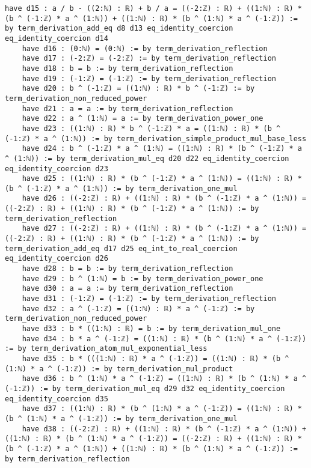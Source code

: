 \documentclass{article}
\begin{document}
\begin{tcolorbox}[colback=white!10, width=\linewidth]
\begin{lstlisting}[language=Lean4]
    have d15 : a / b - ((2:ℕ) : ℝ) + b / a = ((-2:ℤ) : ℝ) + ((1:ℕ) : ℝ) * (b ^ (-1:ℤ) * a ^ (1:ℕ)) + ((1:ℕ) : ℝ) * (b ^ (1:ℕ) * a ^ (-1:ℤ)) := by term_derivation_add_eq d8 d13 eq_identity_coercion eq_identity_coercion d14
    have d16 : (0:ℕ) = (0:ℕ) := by term_derivation_reflection
    have d17 : (-2:ℤ) = (-2:ℤ) := by term_derivation_reflection
    have d18 : b = b := by term_derivation_reflection
    have d19 : (-1:ℤ) = (-1:ℤ) := by term_derivation_reflection
    have d20 : b ^ (-1:ℤ) = ((1:ℕ) : ℝ) * b ^ (-1:ℤ) := by term_derivation_non_reduced_power
    have d21 : a = a := by term_derivation_reflection
    have d22 : a ^ (1:ℕ) = a := by term_derivation_power_one
    have d23 : ((1:ℕ) : ℝ) * b ^ (-1:ℤ) * a = ((1:ℕ) : ℝ) * (b ^ (-1:ℤ) * a ^ (1:ℕ)) := by term_derivation_simple_product_mul_base_less
    have d24 : b ^ (-1:ℤ) * a ^ (1:ℕ) = ((1:ℕ) : ℝ) * (b ^ (-1:ℤ) * a ^ (1:ℕ)) := by term_derivation_mul_eq d20 d22 eq_identity_coercion eq_identity_coercion d23
    have d25 : ((1:ℕ) : ℝ) * (b ^ (-1:ℤ) * a ^ (1:ℕ)) = ((1:ℕ) : ℝ) * (b ^ (-1:ℤ) * a ^ (1:ℕ)) := by term_derivation_one_mul
    have d26 : ((-2:ℤ) : ℝ) + ((1:ℕ) : ℝ) * (b ^ (-1:ℤ) * a ^ (1:ℕ)) = ((-2:ℤ) : ℝ) + ((1:ℕ) : ℝ) * (b ^ (-1:ℤ) * a ^ (1:ℕ)) := by term_derivation_reflection
    have d27 : ((-2:ℤ) : ℝ) + ((1:ℕ) : ℝ) * (b ^ (-1:ℤ) * a ^ (1:ℕ)) = ((-2:ℤ) : ℝ) + ((1:ℕ) : ℝ) * (b ^ (-1:ℤ) * a ^ (1:ℕ)) := by term_derivation_add_eq d17 d25 eq_int_to_real_coercion eq_identity_coercion d26
    have d28 : b = b := by term_derivation_reflection
    have d29 : b ^ (1:ℕ) = b := by term_derivation_power_one
    have d30 : a = a := by term_derivation_reflection
    have d31 : (-1:ℤ) = (-1:ℤ) := by term_derivation_reflection
    have d32 : a ^ (-1:ℤ) = ((1:ℕ) : ℝ) * a ^ (-1:ℤ) := by term_derivation_non_reduced_power
    have d33 : b * ((1:ℕ) : ℝ) = b := by term_derivation_mul_one
    have d34 : b * a ^ (-1:ℤ) = ((1:ℕ) : ℝ) * (b ^ (1:ℕ) * a ^ (-1:ℤ)) := by term_derivation_atom_mul_exponential_less
    have d35 : b * (((1:ℕ) : ℝ) * a ^ (-1:ℤ)) = ((1:ℕ) : ℝ) * (b ^ (1:ℕ) * a ^ (-1:ℤ)) := by term_derivation_mul_product
    have d36 : b ^ (1:ℕ) * a ^ (-1:ℤ) = ((1:ℕ) : ℝ) * (b ^ (1:ℕ) * a ^ (-1:ℤ)) := by term_derivation_mul_eq d29 d32 eq_identity_coercion eq_identity_coercion d35
    have d37 : ((1:ℕ) : ℝ) * (b ^ (1:ℕ) * a ^ (-1:ℤ)) = ((1:ℕ) : ℝ) * (b ^ (1:ℕ) * a ^ (-1:ℤ)) := by term_derivation_one_mul
    have d38 : ((-2:ℤ) : ℝ) + ((1:ℕ) : ℝ) * (b ^ (-1:ℤ) * a ^ (1:ℕ)) + ((1:ℕ) : ℝ) * (b ^ (1:ℕ) * a ^ (-1:ℤ)) = ((-2:ℤ) : ℝ) + ((1:ℕ) : ℝ) * (b ^ (-1:ℤ) * a ^ (1:ℕ)) + ((1:ℕ) : ℝ) * (b ^ (1:ℕ) * a ^ (-1:ℤ)) := by term_derivation_reflection

\end{lstlisting}
\end{tcolorbox}
\end{document}
